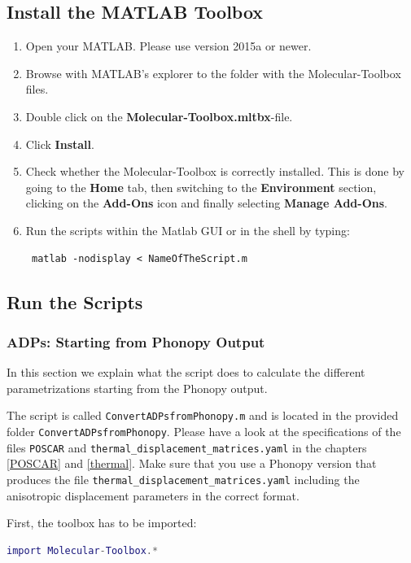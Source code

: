 \documentclass[12pt,a4paper]{article}
\begin{document}
\subsection{Install the MATLAB Toolbox}
\begin{enumerate}
 \item Open your MATLAB. Please use version 2015a or newer.
 \item Browse with MATLAB's explorer to the folder with the Molecular-Toolbox files.
 \item Double click on the \textbf{Molecular-Toolbox.mltbx}-file.
 \item Click \textbf{Install}.
 \item Check whether the Molecular-Toolbox is correctly installed. 
 This is done by going to the \textbf{Home} tab, then switching to the \textbf{Environment} section, clicking on the \textbf{Add-Ons} icon and finally selecting \textbf{Manage Add-Ons}.
 \item Run the scripts within the Matlab GUI or in the shell by typing: \begin{verbatim} matlab -nodisplay < NameOfTheScript.m\end{verbatim}
\end{enumerate}

\newpage
\subsection{Run the Scripts}

\subsubsection{ADPs: Starting from Phonopy Output}
In this section we explain what the script does to calculate the different parametrizations starting from the Phonopy output. 

The script is called \texttt{ConvertADPsfromPhonopy.m} and is located in the provided folder \texttt{ConvertADPsfromPhonopy}. Please have a look at the specifications of the files \texttt{POSCAR} and \texttt{thermal\_displacement\_matrices.yaml} in the chapters \ref{POSCAR} and \ref{thermal}. Make sure that you use a Phonopy version that produces the file  \texttt{thermal\_displacement\_matrices.yaml} including the anisotropic displacement parameters in the correct format.

First, the toolbox has to be imported:
\begin{lstlisting}[frame=single,language=Matlab] 
import Molecular-Toolbox.*
\end{lstlisting}
\end{document}
